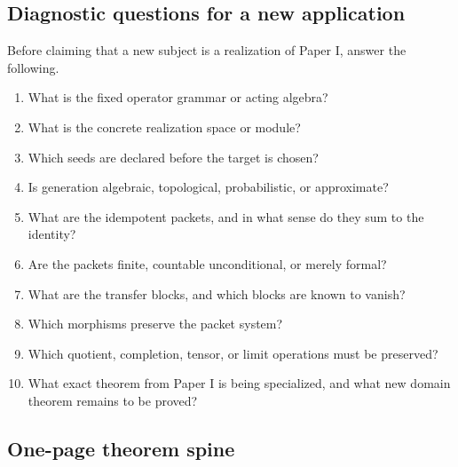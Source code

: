 \subsection{Diagnostic questions for a new application}
Before claiming that a new subject is a realization of Paper I, answer the following.
\begin{enumerate}
\item What is the fixed operator grammar or acting algebra?
\item What is the concrete realization space or module?
\item Which seeds are declared before the target is chosen?
\item Is generation algebraic, topological, probabilistic, or approximate?
\item What are the idempotent packets, and in what sense do they sum to the identity?
\item Are the packets finite, countable unconditional, or merely formal?
\item What are the transfer blocks, and which blocks are known to vanish?
\item Which morphisms preserve the packet system?
\item Which quotient, completion, tensor, or limit operations must be preserved?
\item What exact theorem from Paper I is being specialized, and what new domain theorem remains to be proved?
\end{enumerate}

\subsection{One-page theorem spine}

